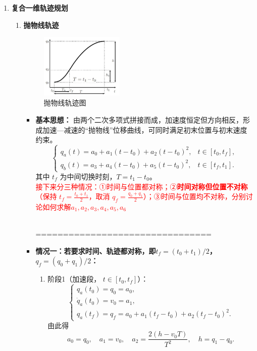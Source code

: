 \documentclass[../main.tex]{subfiles}
\begin{document}
\begin{enumerate}
    \item \textbf{复合一维轨迹规划}\label{sec:composite-1d}
        \begin{enumerate}
            \item \textbf{抛物线轨迹}\label{method:parabola}
                    \begin{figure}[H]
                        \centering
                        \includegraphics[width=0.4\textwidth]{images/pwx0.png}
                        \caption{抛物线轨迹图}
                    \end{figure}    
            {\small\kaishu
            \begin{itemize}
                \item \textbf{基本思想：}  
                由两个二次多项式拼接而成，加速度恒定但方向相反，形成加速—减速的“抛物线”位移曲线，可同时满足初末位置与初末速度约束。
                \[
                \begin{cases}
                q_a(t) = a_0 + a_1(t-t_0) + a_2(t-t_0)^2, & t\in[t_0,t_f],\\[4pt]
                q_b(t) = a_3 + a_4(t-t_0) + a_5(t-t_0)^2, & t\in[t_f,t_1].
                \end{cases}
                \]
                其中 $t_f$ 为中间切换时刻，$T=t_1-t_0$。\\
                \textcolor{red}{接下来分三种情况：\;①时间与位置都对称；②\textbf{时间对称但位置不对称}（保持 $t_f=\tfrac{t_0+t_1}{2}$，取消 $q_f=\tfrac{q_0+q_1}{2}$）；③时间与位置均不对称，分别讨论如何求解$a_1,a_2,a_3,a_4,a_5,a_6$}

                \\================================   
                \item \textbf{情况一：若要求时间、轨迹都对称，即$t_f=(t_0+t_1)/2$，$q_f=(q_0+q_1)/2$：}
                \begin{enumerate}
                    \item 阶段1（加速段， $t\in[t_0,t_f]$）：
                    \[
                    \begin{cases}
                    q_a(t_0)=q_0=a_0,\\
                    \dot q_a(t_0)=v_0=a_1,\\
                    q_a(t_f)=q_f=a_0+a_1(t_f-t_0)+a_2(t_f-t_0)^2.
                    \end{cases}
                    \]
                    由此得
                    \[
                    a_0=q_0,\quad a_1=v_0,\quad a_2=\frac{2(h-v_0T)}{T^2},\quad h=q_1-q_0.
                    \]
        

\end{enumerate}
\end{itemize}}
\end{enumerate}
\end{enumerate}
\end{document}
